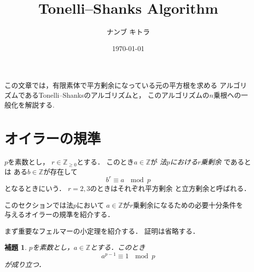 \documentclass[leqno]{jsarticle}
\title{Tonelli--Shanks Algorithm}
\author{ナンブ キトラ}
\date{\today}
\newtheorem{lem}[thm]{補題}
\newcommand{\zz}{\mathbb{Z}}
\begin{document}
\maketitle


この文章では，有限素体で平方剰余になっている元の平方根を求める
アルゴリズムであるTonelli--Shanksのアルゴリズムと，
このアルゴリズムの$n$乗根への一般化を解説する.


\section{オイラーの規準}

$p$を素数とし，
$r\in \zz_{\ge 0}$とする．
このとき$a\in \zz$が
\emph{法$p$における$r$乗剰余}
であるとは
ある$b\in \zz$が存在して
\[
b^r\equiv a\ \mod p
\]
となるときにいう．
$r=2, 3$のときはそれぞれ平方剰余
と立方剰余と呼ばれる．

このセクションでは法$p$において
$a\in \zz$が$r$乗剰余になるための必要十分条件を
与えるオイラーの規準を紹介する．

まず重要なフェルマーの小定理を紹介する．
証明は省略する．
\begin{lem}
$p$を素数とし，$a\in \zz$とする．このとき
\[
a^{p-1}\equiv 1\ \mod p
\]
が成り立つ．
\end{lem}
\end{document}
